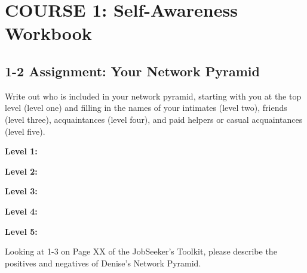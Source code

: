\hypertarget{course1workbook}{}\chapter*{COURSE 1: Self-Awareness Workbook}\label{course1workbook}
\noindent\makebox[\textwidth]{\rule{\linewidth}{0.4pt}}
\localtableofcontents


\pagebreak \section*{1-2 Assignment: Your Network Pyramid}\label{course1workbook1_2}
 
Write out who is included in your network pyramid, starting with you at the top level (level one) and filling in the names of your intimates (level two), friends (level three), acquaintances (level four), and paid helpers or casual acquaintances (level five).

\textbf{Level 1:} \hrulefill

\textbf{Level 2:} \hrulefill

\hrulefill

\hrulefill

\hrulefill

\hrulefill

\textbf{Level 3:} \hrulefill

\hrulefill

\hrulefill

\hrulefill

\hrulefill

\textbf{Level 4:} \hrulefill

\hrulefill

\hrulefill

\hrulefill

\hrulefill

\hrulefill


\textbf{Level 5:} \hrulefill

\hrulefill

\hrulefill

\hrulefill

\hrulefill

\hrulefill

\hrulefill
\clearpage
Looking at 1-3 on Page XX of the JobSeeker's Toolkit, please describe the positives and negatives of Denise's Network Pyramid. 

